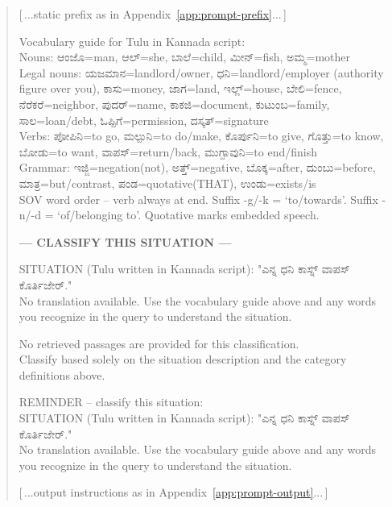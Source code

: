 \documentclass[11pt]{article}
\begin{document}
\begin{quote}
\ttfamily\small
[\,...static prefix as in Appendix~\ref{app:prompt-prefix}...\,]

Vocabulary guide for Tulu in Kannada script:\\
Nouns: {\kannadafont ಆಂಜೊ}=man, {\kannadafont ಆಲ್}=she, {\kannadafont ಬಾಲೆ}=child, {\kannadafont ಮೀನ್}=fish, {\kannadafont ಅಮ್ಮ}=mother\\
Legal nouns: {\kannadafont ಯಜಮಾನ}=landlord/owner, {\kannadafont ಧನಿ}=landlord/employer (authority figure over you), {\kannadafont ಕಾಸು}=money, {\kannadafont ಜಾಗ}=land, {\kannadafont ಇಲ್ಲ್}=house, {\kannadafont ಬೇಲಿ}=fence, {\kannadafont ನೆರೆಕರೆ}=neighbor, {\kannadafont ಪುದರ್}=name, {\kannadafont ಕಾಕಜಿ}=document, {\kannadafont ಕುಟುಂಬ}=family, {\kannadafont ಸಾಲ}=loan/debt, {\kannadafont ಓಪ್ಪಿಗೆ}=permission, {\kannadafont ದಸ್ಕತ್}=signature\\
Verbs: {\kannadafont ಪೋಪಿನಿ}=to go, {\kannadafont ಮಲ್ಪುನಿ}=to do/make, {\kannadafont ಕೊರ್ಪುನಿ}=to give, {\kannadafont ಗೊತ್ತು}=to know, {\kannadafont ಬೋಡು}=to want, {\kannadafont ವಾಪಸ್}=return/back, {\kannadafont ಮುಗ್ಪಾವುನಿ}=to end/finish\\
Grammar: {\kannadafont ಇಜ್ಜಿ}=negation(not), {\kannadafont ಅತ್ತ್}=negative, {\kannadafont ಬೊಕ್ಕ}=after, {\kannadafont ದುಂಬು}=before, {\kannadafont ಮಾತ್ರ}=but/contrast, {\kannadafont ಪಂಡ}=quotative(THAT), {\kannadafont ಉಂಡು}=exists/is\\
SOV word order -- verb always at end. Suffix -g/-k = `to/towards'. Suffix -n/-d = `of/belonging to'. Quotative marks embedded speech.

\medskip
\textbf{--- CLASSIFY THIS SITUATION ---}

SITUATION (Tulu written in Kannada script): "{\kannadafont ಎನ್ನ ಧನಿ ಕಾಸ್ನ್ ವಾಪಸ್ ಕೊರ್ತಿಜೇರ್.}"\\
No translation available. Use the vocabulary guide above and any words you recognize in the query to understand the situation.

No retrieved passages are provided for this classification.\\
Classify based solely on the situation description and the category definitions above.

REMINDER -- classify this situation:\\
SITUATION (Tulu written in Kannada script): "{\kannadafont ಎನ್ನ ಧನಿ ಕಾಸ್ನ್ ವಾಪಸ್ ಕೊರ್ತಿಜೇರ್.}"\\
No translation available. Use the vocabulary guide above and any words you recognize in the query to understand the situation.

[\,...output instructions as in Appendix~\ref{app:prompt-output}...\,]
\end{quote}
\end{document}
